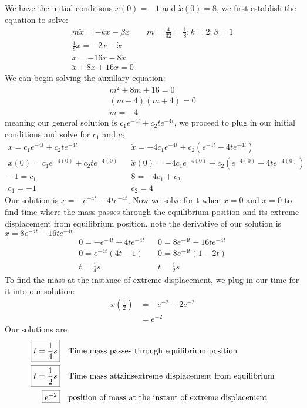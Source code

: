 \documentclass{article}
\begin{document}
We have the initial conditions $ x(0) = -1 $ and $ \dot x(0) = 8$, we first establish the equation to solve:
\begin{align}
    m\ddot x = -kx - \beta \dot x && m = \frac{4}{32} = \frac{1}{8} ; k = 2 ; \beta = 1 \\
    \frac{1}{8}\ddot x = -2x - \dot x \\
    \ddot x = -16x - 8 \dot x \\
    \ddot x + 8 \dot x + 16x = 0
\end{align}
We can begin solving the auxillary equation:
\begin{align}
    m^2 + 8m + 16 = 0 \\
    (m + 4)(m + 4) = 0 \\
    m = -4
\end{align}
meaning our general solution is $ c_1e^{-4t} + c_2te^{-4t} $, we proceed to plug in our initial conditions and solve for $c_1$ and $c_2$
\begin{align}
    x = c_1e^{-4t} + c_2te^{-4t} && \dot x = -4c_1e^{-4t} + c_2(e^{-4t} -4te^{-4t}) \\
    x(0) =  c_1e^{-4(0)} + c_2te^{-4(0)} && \dot x(0) = -4c_1e^{-4(0)} + c_2(e^{-4(0)} -4te^{-4(0)}) \\
    -1 =  c_1  && 8 = -4c_1 + c_2 \\
    c_1 = -1 && c_2 = 4
\end{align}
Our solution is $x = -e^{-4t} + 4te^{-4t}$, Now we solve for t when $ x = 0$ and $\dot x = 0$ to find time where the mass passes through the equilibrium position and its extreme displacement from equilibrium position, note the derivative of our solution is $\dot x = 8e^{-4t} - 16te^{-4t} $
\begin{align}
    0 = -e^{-4t} + 4te^{-4t} && 0 = 8e^{-4t} - 16te^{-4t} \\
    0 = e^{-4t}(4t - 1) && 0 = 8e^{-4t}(1 - 2t)\\
    t =\frac{1}{4} s && t = \frac{1}{2} s
\end{align}
To find the mass at the instance of extreme displacement, we plug in our time for it into our solution:
\begin{align}
    x(\frac{1}{2}) &= -e^{-2} + 2e^{-2} \\
    &= e^{-2}
\end{align}
Our solutions are
\begin{align*}
    \Aboxed{t =\frac{1}{4} s} && \text{Time mass passes through equilibrium position} \\ \Aboxed{t = \frac{1}{2} s} && \text{Time mass attainsextreme displacement from equilibrium} \\ \Aboxed{e^{-2}} && \text{position of mass at the instant of extreme displacement}
\end{align*}
\end{document}
